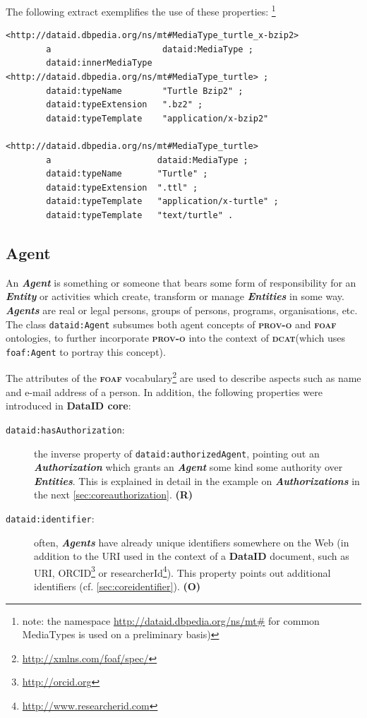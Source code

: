 \documentclass[a4paper,english,twoside,BCOR1.5cm,headsepline,DIV12,appendixprefix,final,12pt]{scrbook}
\newcommand{\dataid}{{\ttfamily\bfseries DataID}\xspace}
\newcommand{\core}{{\ttfamily\bfseries DataID core}\xspace}
\newcommand{\prov}{{\scshape\bfseries prov-o}\xspace}
\newcommand{\dcat}{{\scshape\bfseries dcat}\xspace}
\newcommand{\foaf}{{\scshape\bfseries foaf}\xspace}
\newcommand{\prop}[1]{{{\texttt{#1}}}}
\newcommand{\important}[1]{\textbf{\textit{#1}}}
\newcommand\footnoteurl[1]{\footnote{\scriptsize\url{#1}}}
\begin{document}
The following extract exemplifies the use of these properties:
\footnote{note: the namespace \url{http://dataid.dbpedia.org/ns/mt#} for common MediaTypes is used on a preliminary basis)}
\\
\begin{lstlisting}[language=ttl, captionpos=b,caption=Example of a complex media type,label=lst:coresuperset,linewidth=\columnwidth,breaklines=true]
<http://dataid.dbpedia.org/ns/mt#MediaType_turtle_x-bzip2>
        a                      dataid:MediaType ;
        dataid:innerMediaType  <http://dataid.dbpedia.org/ns/mt#MediaType_turtle> ;  
        dataid:typeName        "Turtle Bzip2" ;
        dataid:typeExtension   ".bz2" ;  
        dataid:typeTemplate    "application/x-bzip2" 

<http://dataid.dbpedia.org/ns/mt#MediaType_turtle>
        a                     dataid:MediaType ;
        dataid:typeName       "Turtle" ;
        dataid:typeExtension  ".ttl" ;
        dataid:typeTemplate   "application/x-turtle" ;   
        dataid:typeTemplate   "text/turtle" .
\end{lstlisting}

\subsection{Agent} 
\label{sec:coreagent}
An \important{Agent} is something or someone that bears some form of responsibility for an \important{Entity} or activities which create, transform or manage \important{Entities} in some way. \important{Agents} are real or legal persons, groups of persons, programs, organisations, etc. The class \prop{dataid:Agent} subsumes both agent concepts of \prov and \foaf ontologies, to further incorporate \prov into the context of \dcat (which uses \prop{foaf:Agent} to portray this concept). 

The attributes of the \foaf vocabulary\footnoteurl{http://xmlns.com/foaf/spec/} are used to describe aspects such as name and e-mail address of a person. In addition, the following properties were introduced in \core:

\begin{description}
\item[\prop{dataid:hasAuthorization}:] the inverse property of \prop{dataid:authorizedAgent}, pointing out an \important{Authorization} which grants an \important{Agent} some kind some authority over \important{Entities}. This is explained in detail in the example on \important{Authorizations} in the next \cref{sec:coreauthorization}. \textbf{(R)}
\item[\prop{dataid:identifier}:] often, \important{Agents} have already unique identifiers somewhere on the Web (in addition to the URI used in the context of a \dataid document, such as URI, ORCID\footnoteurl{http://orcid.org} or researcherId\footnoteurl{http://www.researcherid.com}). This property points out additional identifiers (cf. \cref{sec:coreidentifier}). \textbf{(O)}
\end{description}
\end{document}
